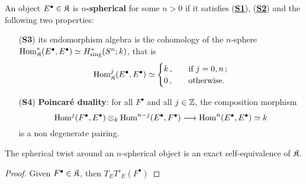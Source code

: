 \begin{df}
	An object $E^{\bullet} \in \mathfrak{K}$ is \textbf{$n$-spherical} for some $n > 0$
	if it satisfies (\hyperref[S1]{\textbf{S1}}), (\hyperref[S2]{\textbf{S2}})
	and the following two properties:
	\begin{itemize}
		\item[(\textbf{S3})]\label{S3} its endomorphism algebra is the cohomology of the $n$-sphere
		$\operatorname{Hom}^{*}_{\mathfrak{K}}(E^{\bullet},E^{\bullet}) \simeq H^{*}_{\textrm{sing}}(S^{n};k)$, that is
		\begin{equation*}
			\operatorname{Hom}^{j}_{\mathfrak{K}}(E^{\bullet},E^{\bullet}) \simeq
			\begin{cases}
				k \,, \quad &\text{if } j=0,n\,; \\
				0 \,, \quad &\text{otherwise}.
			\end{cases}
		\end{equation*}
		
		\item[(\textbf{S4})]\label{S4} \textbf{Poincaré duality}: for all $F^{\bullet}$
		and all $j \in {\mathbb Z}$, the composition morphism
		\begin{equation*}
			\operatorname{Hom}^{j}(F^{\bullet},E^{\bullet}) \otimes_{k} \operatorname{Hom}^{n-j}(E^{\bullet},F^{\bullet})
			\longrightarrow \operatorname{Hom}^{n}(E^{\bullet},E^{\bullet}) \simeq k
		\end{equation*}
		is a non degenerate pairing.
	\end{itemize}
\end{df}


\begin{thm}
	The spherical twist around an $n$-spherical object is an exact self-equivalence of $\mathfrak{K}$.
	\begin{proof}
		Given $F^{\bullet} \in \mathfrak{K}$, then $T_{E}T'_{E}(F^{\bullet})$
	\end{proof}
\end{thm}



